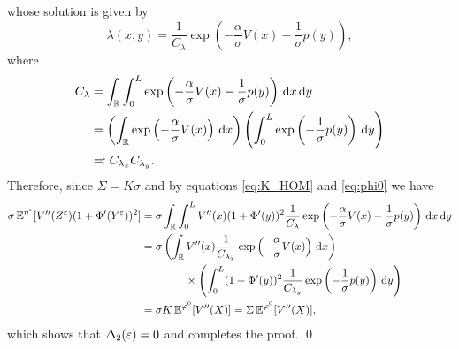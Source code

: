\documentclass[10pt]{article}
\begin{document}
\begin{appendices}
\begin{equation}
	\end{equation}
	whose solution is given by
	\begin{equation}
	\lambda(x,y) = \frac{1}{C_\lambda} \exp \left( - \frac\alpha\sigma V(x) - \frac1\sigma p(y) \right),
	\end{equation}
	where
	\begin{equation}
	\begin{aligned}
	C_{\lambda} &= \int_{\mathbb{R}} \int_0^L \exp \left( - \frac\alpha\sigma V(x) - \frac1\sigma p(y) \right) \,\mathrm{d} x \,\mathrm{d} y \\
	&= \left( \int_{\mathbb{R}} \exp \left( - \frac\alpha\sigma V(x) \right) \,\mathrm{d} x \right) \left( \int_0^L \exp \left( - \frac1\sigma p(y) \right) \,\mathrm{d} y \right) \\
	&\eqqcolon C_{\lambda_x} C_{\lambda_y}.
	\end{aligned}
	\end{equation}
	Therefore, since $\Sigma = K\sigma$ and by equations \eqref{eq:K_HOM} and \eqref{eq:phi0} we have
	\begin{equation}
	\begin{aligned}
	\sigma \operatorname{\mathbb{E}}^{\eta^\varepsilon} [V''(Z^\varepsilon) (1 + \Phi'(Y^\varepsilon))^2] &= \sigma \int_{\mathbb{R}} \int_0^L V''(x) (1 + \Phi'(y))^2 \frac{1}{C_\lambda} \exp \left( - \frac\alpha\sigma V(x) - \frac1\sigma p(y) \right) \,\mathrm{d} x \,\mathrm{d} y \\
	&= \sigma \left( \int_{\mathbb{R}} V''(x) \frac{1}{C_{\lambda_x}} \exp \left( - \frac\alpha\sigma V(x) \right) \,\mathrm{d} x \right) \\
	&\qquad \qquad \times \left( \int_0^L (1+\Phi'(y))^2 \frac{1}{C_{\lambda_y}} \exp \left( - \frac1\sigma p(y) \right) \,\mathrm{d} y \right) \\
	&= \sigma K \operatorname{\mathbb{E}}^{\varphi^0}[V''(X)] = \Sigma \operatorname{\mathbb{E}}^{\varphi^0}[V''(X)],
	\end{aligned}
	\end{equation}
	which shows that $\Delta_2(\varepsilon) = 0$ and completes the proof. \qed 
\end{appendices}




\end{document}
